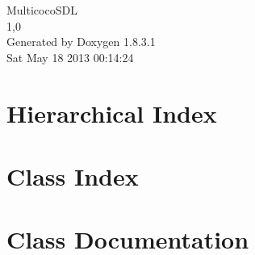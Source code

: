 \documentclass{book}
\begin{document}
\hypersetup{pageanchor=false,citecolor=blue}
\begin{titlepage}
\vspace*{7cm}
\begin{center}
{\Large Multicoco\-S\-D\-L \\[1ex]\large 1,0 }\\
\vspace*{1cm}
{\large Generated by Doxygen 1.8.3.1}\\
\vspace*{0.5cm}
{\small Sat May 18 2013 00:14:24}\\
\end{center}
\end{titlepage}
\clearemptydoublepage
{}
\tableofcontents
\clearemptydoublepage
{}
\hypersetup{pageanchor=true,citecolor=blue}
\chapter{Hierarchical Index}

\chapter{Class Index}

\chapter{Class Documentation}















\printindex
\end{document}
